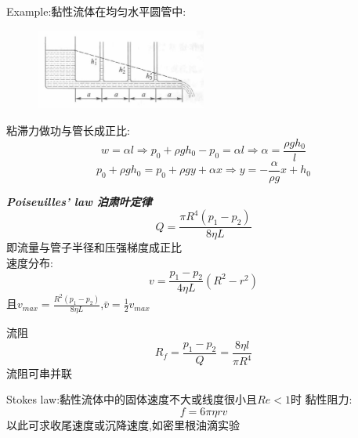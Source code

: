 \documentclass[10pt,a4paper]{article}
\begin{document}
\begin{footnotesize}
Example:黏性流体在均匀水平圆管中:
\begin{figure}[h]
\begin{center}
\includegraphics[width=0.5\textwidth]{p1.jpg}
\end{center}
\end{figure}    

粘滞力做功与管长成正比:
\[w=\alpha l\Rightarrow p_0+\rho gh_0-p_0=\alpha l\Rightarrow \alpha=\frac{\rho gh_0}{l}\]
\[p_0+\rho gh_0=p_0+\rho gy+\alpha x\Rightarrow y=-\frac{\alpha}{\rho g}x+h_0\]
\end{footnotesize}

\textbf{\textit{Poiseuilles' law 泊肃叶定律}}
\[\boxed{Q=\frac{\pi R^4(p_1-p_2)}{8\eta L}}\]
即流量与管子半径和压强梯度成正比\\
速度分布:
\[\boxed{v=\frac{p_1-p_2}{4\eta L}(R^2-r^2)}\]
且$v_{max}=\frac{R^2(p_1-p_2)}{8\eta L}$,$\bar{v}=\frac{1}{2}v_{max}$

流阻
\[R_f=\frac{p_1-p_2}{Q}=\boxed{\frac{8\eta l}{\pi R^4}}\]
流阻可串并联

Stokes law:黏性流体中的固体速度不大或线度很小且$Re<1$时
黏性阻力:\[f=6\pi\eta rv\]以此可求收尾速度或沉降速度,如密里根油滴实验
\end{document}
